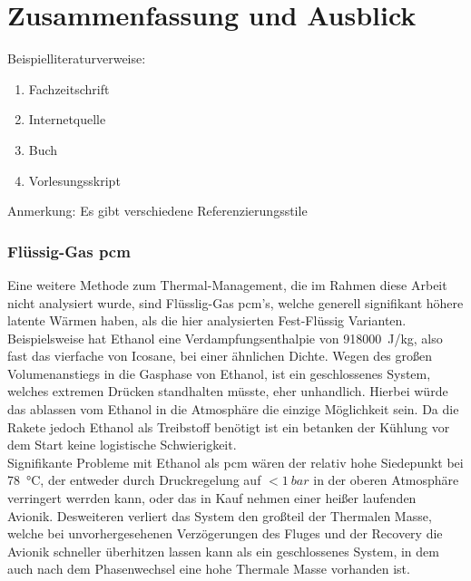 \chapter{Zusammenfassung und Ausblick}
\label{chap:Ausblick}
\pagestyle{OnlySection}		%

Beispielliteraturverweise: 

\begin{enumerate}
	\item Fachzeitschrift
	\item Internetquelle
	\item Buch 
	\item Vorlesungsskript
\end{enumerate}

Anmerkung: Es gibt verschiedene Referenzierungsstile 

\subsection{Flüssig-Gas \ac{pcm}}
Eine weitere Methode zum Thermal-Management, die im Rahmen diese Arbeit nicht analysiert wurde, sind Flüsslig-Gas \ac{pcm}'s, welche generell signifikant höhere latente Wärmen haben,
als die hier analysierten Fest-Flüssig Varianten. Beispielsweise hat Ethanol eine Verdampfungsenthalpie von \SI{918000}{J/kg}, also fast das vierfache von Icosane, bei einer
ähnlichen Dichte. Wegen des großen Volumenanstiegs in die Gasphase von Ethanol, ist ein geschlossenes System, welches extremen Drücken standhalten müsste, eher unhandlich. Hierbei würde
das ablassen vom Ethanol in die Atmosphäre die einzige Möglichkeit sein. Da die Rakete jedoch Ethanol als Treibstoff benötigt ist ein betanken der Kühlung vor dem Start keine logistische Schwierigkeit.\\

Signifikante Probleme mit Ethanol als \ac{pcm} wären der relativ hohe Siedepunkt bei \SI{78}{\degreeCelsius}, der entweder durch Druckregelung auf $< \SI{1}{bar}$ in der oberen Atmosphäre
verringert werrden kann, oder das in Kauf nehmen einer heißer laufenden Avionik. Desweiteren verliert das System den großteil der Thermalen Masse, welche bei unvorhergesehenen Verzögerungen
des Fluges und der Recovery die Avionik schneller überhitzen lassen kann als ein geschlossenes System, in dem auch nach dem Phasenwechsel eine hohe Thermale Masse vorhanden ist.